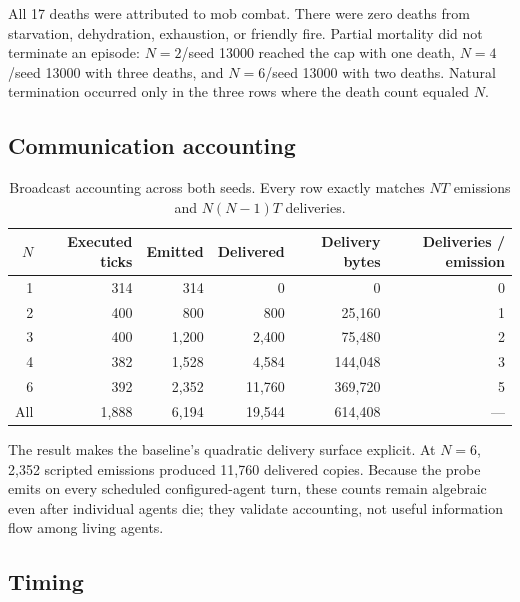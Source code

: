 \documentclass[11pt]{article}
\begin{document}
All 17 deaths were attributed to mob combat.  There were zero deaths from
starvation, dehydration, exhaustion, or friendly fire.  Partial mortality did
not terminate an episode: $N=2$/seed 13000 reached the cap with one death,
$N=4$/seed 13000 with three deaths, and $N=6$/seed 13000 with two deaths.
Natural termination occurred only in the three rows where the death count
equaled $N$.

\subsection{Communication accounting}

\begin{table}[ht]
\centering
\small
\begin{tabular}{@{}rrrrrr@{}}
\toprule
$N$ & Executed ticks & Emitted & Delivered & Delivery bytes &
Deliveries / emission\\
\midrule
1 & 314 & 314   & 0      & 0       & 0\\
2 & 400 & 800   & 800    & 25,160  & 1\\
3 & 400 & 1,200 & 2,400  & 75,480  & 2\\
4 & 382 & 1,528 & 4,584  & 144,048 & 3\\
6 & 392 & 2,352 & 11,760 & 369,720 & 5\\
\midrule
All & 1,888 & 6,194 & 19,544 & 614,408 & ---\\
\bottomrule
\end{tabular}
\caption{Broadcast accounting across both seeds.  Every row exactly matches
$NT$ emissions and $N(N-1)T$ deliveries.}
\label{tab:communication}
\end{table}

The result makes the baseline's quadratic delivery surface explicit.  At
$N=6$, 2,352 scripted emissions produced 11,760 delivered copies.  Because the
probe emits on every scheduled configured-agent turn, these counts remain
algebraic even after individual agents die; they validate accounting, not useful
information flow among living agents.

\subsection{Timing}
\end{document}
